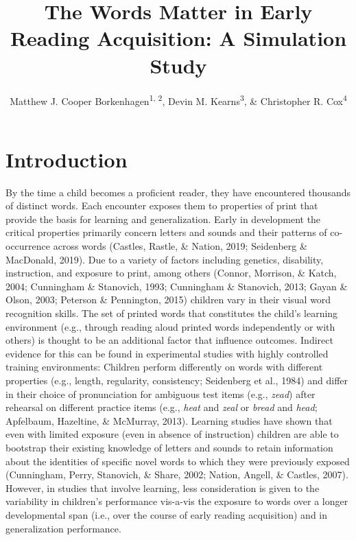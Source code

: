 \documentclass[
  ,man,floatsintext]{apa6}
\title{The Words Matter in Early Reading Acquisition: A Simulation Study}
\author{Matthew J. Cooper Borkenhagen\textsuperscript{1, 2}, Devin M. Kearns\textsuperscript{3}, \& Christopher R. Cox\textsuperscript{4}}
\date{}
\affiliation{\vspace{0.5cm}\textsuperscript{1} Florida State University\\\textsuperscript{2} The Florida Center for Reading Research\\\textsuperscript{3} North Carolina State University\\\textsuperscript{4} Louisiana State University}
\begin{document}
\maketitle

\section{Introduction}\label{introduction}

By the time a child becomes a proficient reader, they have encountered thousands of distinct words. Each encounter exposes them to properties of print that provide the basis for learning and generalization. Early in development the critical properties primarily concern letters and sounds and their patterns of co-occurrence across words (Castles, Rastle, \& Nation, 2019; Seidenberg \& MacDonald, 2019). Due to a variety of factors including genetics, disability, instruction, and exposure to print, among others (Connor, Morrison, \& Katch, 2004; Cunningham \& Stanovich, 1993; Cunningham \& Stanovich, 2013; Gayan \& Olson, 2003; Peterson \& Pennington, 2015) children vary in their visual word recognition skills. The set of printed words that constitutes the child's learning environment (e.g., through reading aloud printed words independently or with others) is thought to be an additional factor that influence outcomes. Indirect evidence for this can be found in experimental studies with highly controlled training environments: Children perform differently on words with different properties (e.g., length, regularity, consistency; Seidenberg et al., 1984) and differ in their choice of pronunciation for ambiguous test items (e.g., \emph{zead}) after rehearsal on different practice items (e.g., \emph{heat} and \emph{zeal} or \emph{bread} and \emph{head}; Apfelbaum, Hazeltine, \& McMurray, 2013). Learning studies have shown that even with limited exposure (even in absence of instruction) children are able to bootstrap their existing knowledge of letters and sounds to retain information about the identities of specific novel words to which they were previously exposed (Cunningham, Perry, Stanovich, \& Share, 2002; Nation, Angell, \& Castles, 2007). However, in studies that involve learning, less consideration is given to the variability in children's performance vis-a-vis the exposure to words over a longer developmental span (i.e., over the course of early reading acquisition) and in generalization performance.
\end{document}
